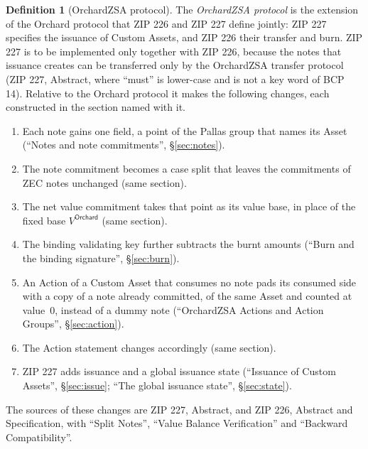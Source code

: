 \documentclass[11pt,a4paper]{article}
\theoremstyle{definition}
\newtheorem{definition}[theorem]{Definition}
\begin{document}
\begin{definition}[OrchardZSA protocol]\label{def:orchardzsa}
The \emph{OrchardZSA protocol} is the extension of the Orchard protocol that
ZIP 226 and ZIP 227 define jointly: ZIP 227 specifies the issuance of Custom
Assets, and ZIP 226 their transfer and burn. ZIP 227 is to be implemented
only together with ZIP 226, because the notes that issuance creates can be
transferred only by the OrchardZSA transfer protocol (ZIP 227, Abstract,
where ``must'' is lower-case and is not a key word of BCP 14). Relative to
the Orchard protocol it makes the following changes, each constructed in the
section named with it.
\begin{enumerate}[label=(\arabic*)]
\item Each note gains one field, a point of the Pallas group that names its
  Asset (``Notes and note commitments'', \S\ref{sec:notes}).
\item The note commitment becomes a case split that leaves the commitments
  of ZEC notes unchanged (same section).
\item The net value commitment takes that point as its value base, in place
  of the fixed base $V^{\mathsf{Orchard}}$ (same section).
\item The binding validating key further subtracts the burnt amounts
  (``Burn and the binding signature'', \S\ref{sec:burn}).
\item An Action of a Custom Asset that consumes no note pads its consumed
  side with a copy of a note already committed, of the same Asset and
  counted at value~$0$, instead of a dummy note (``OrchardZSA Actions and
  Action Groups'', \S\ref{sec:action}).
\item The Action statement changes accordingly (same section).
\item ZIP 227 adds issuance and a global issuance state (``Issuance of
  Custom Assets'', \S\ref{sec:issue}; ``The global issuance state'',
  \S\ref{sec:state}).
\end{enumerate}
The sources of these changes are ZIP 227, Abstract, and ZIP 226, Abstract
and Specification, with ``Split Notes'', ``Value Balance Verification'' and
``Backward Compatibility''.
\end{definition}
\end{document}
